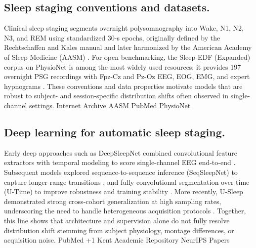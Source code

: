 \documentclass{article}
\begin{document}
\subsection{Sleep staging conventions and datasets.}
Clinical sleep staging segments overnight polysomnography into Wake, N1, N2, N3, and REM using standardized 30-s epochs, originally defined by the Rechtschaffen and Kales manual and later harmonized by the American Academy of Sleep Medicine (AASM) \citep{RechtschaffenKales1968,Iber2007AASM,Berry2012AASMUpdate}. For open benchmarking, the Sleep-EDF (Expanded) corpus on PhysioNet is among the most widely used resources; it provides 197 overnight PSG recordings with Fpz-Cz and Pz-Oz EEG, EOG, EMG, and expert hypnograms \citep{kemp2000microcontinuity,goldberger2000physionet,sleepedfx2018}. These conventions and data properties motivate models that are robust to subject- and session-specific distribution shifts often observed in single-channel settings. 
Internet Archive
AASM
PubMed
PhysioNet

\subsection{Deep learning for automatic sleep staging.}
Early deep approaches such as DeepSleepNet combined convolutional feature extractors with temporal modeling to score single-channel EEG end-to-end \citep{supratak2017deepsleepnet}. Subsequent models explored sequence-to-sequence inference (SeqSleepNet) to capture longer-range transitions \citep{Phan2019SeqSleepNet}, and fully convolutional segmentation over time (U-Time) to improve robustness and training stability \citep{perslev2019utime}. More recently, U-Sleep demonstrated strong cross-cohort generalization at high sampling rates, underscoring the need to handle heterogeneous acquisition protocols \citep{Perslev2021USleep}. Together, this line shows that architecture and supervision alone do not fully resolve distribution shift stemming from subject physiology, montage differences, or acquisition noise. 
PubMed
+1
Kent Academic Repository
NeurIPS Papers
\end{document}
